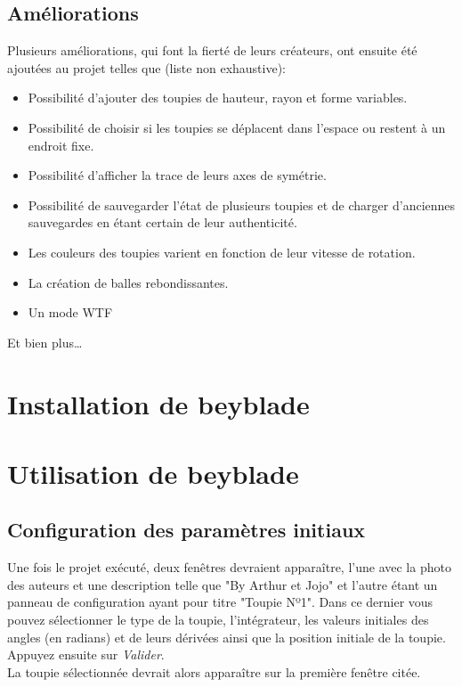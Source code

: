 \documentclass[a4paper]{article}%
\begin{document}
	\subsection {Améliorations}
		Plusieurs améliorations, qui font la fierté de leurs créateurs, ont ensuite été ajoutées au projet telles que (liste non exhaustive):
	
		\begin {itemize}
			\item Possibilité d'ajouter des toupies de hauteur, rayon et forme variables.
			\item Possibilité de choisir si les toupies se déplacent dans l'espace ou restent à un endroit fixe. 
			\item Possibilité d'afficher la trace de leurs axes de symétrie. 
			\item Possibilité de sauvegarder l'état de plusieurs toupies et de charger d'anciennes sauvegardes en étant certain de leur authenticité.
			\item Les couleurs des toupies varient en fonction de leur vitesse de rotation.
			\item La création de balles rebondissantes.
			\item Un mode WTF 
		\end {itemize}
		Et bien plus…

\section{Installation de beyblade}

\section{Utilisation de beyblade}
	\subsection {Configuration des paramètres initiaux}
		Une fois le projet exécuté, deux fenêtres devraient apparaître, l'une avec la photo des auteurs et une description telle que "By Arthur et Jojo" et l'autre étant un panneau de configuration ayant pour titre "Toupie Nº1". Dans ce dernier vous pouvez sélectionner le type de la toupie, l'intégrateur, les valeurs initiales des angles (en radians) et de leurs dérivées ainsi que la position initiale de la toupie. Appuyez ensuite sur \emph{Valider}. \\
	
	La toupie sélectionnée devrait alors apparaître sur la première fenêtre citée. 
\end{document}
